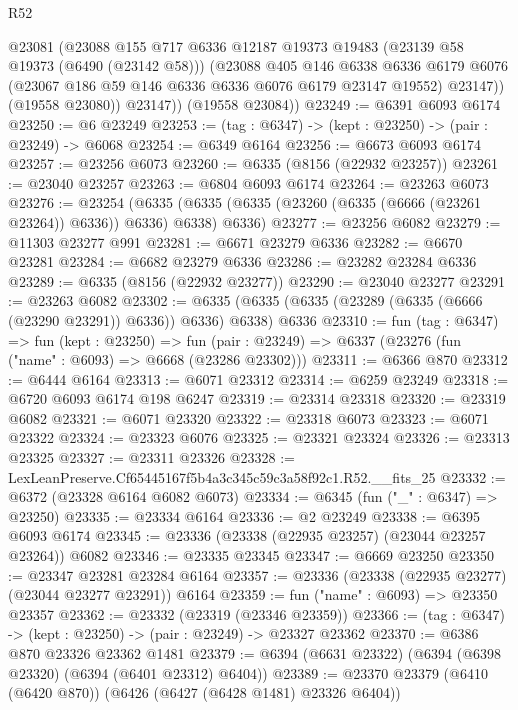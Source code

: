 \begin{lexlean}{R52}
\begin{coremodule}
            @23081
            (@23088
              @155
              @717
              @6336
              @12187
              @19373
              @19483
              (@23139 @58 @19373 (@6490 (@23142 @58)))
              (@23088
                @405
                @146
                @6338
                @6336
                @6179
                @6076
                (@23067 @186 @59 @146 @6336 @6336 @6076 @6179 @23147 @19552)
                @23147))
            (@19558 @23080))
          @23147))
      (@19558 @23084))
@23249 := @6391 @6093 @6174
@23250 := @6 @23249
@23253 := (tag : @6347) -> (kept : @23250) -> (pair : @23249) -> @6068
@23254 := @6349 @6164
@23256 := @6673 @6093 @6174
@23257 := @23256 @6073
@23260 := @6335 (@8156 (@22932 @23257))
@23261 := @23040 @23257
@23263 := @6804 @6093 @6174
@23264 := @23263 @6073
@23276 := @23254
    (@6335 (@6335 (@6335 (@23260 (@6335 (@6666 (@23261 @23264)) @6336)) @6336) @6338) @6336)
@23277 := @23256 @6082
@23279 := @11303 @23277 @991
@23281 := @6671 @23279 @6336
@23282 := @6670 @23281
@23284 := @6682 @23279 @6336
@23286 := @23282 @23284 @6336
@23289 := @6335 (@8156 (@22932 @23277))
@23290 := @23040 @23277
@23291 := @23263 @6082
@23302 := @6335 (@6335 (@6335 (@23289 (@6335 (@6666 (@23290 @23291)) @6336)) @6336) @6338) @6336
@23310 := fun (tag : @6347) =>
  fun (kept : @23250) =>
  fun (pair : @23249) => @6337 (@23276 (fun ("name" : @6093) => @6668 (@23286 @23302)))
@23311 := @6366 @870
@23312 := @6444 @6164
@23313 := @6071 @23312
@23314 := @6259 @23249
@23318 := @6720 @6093 @6174 @198 @6247
@23319 := @23314 @23318
@23320 := @23319 @6082
@23321 := @6071 @23320
@23322 := @23318 @6073
@23323 := @6071 @23322
@23324 := @23323 @6076
@23325 := @23321 @23324
@23326 := @23313 @23325
@23327 := @23311 @23326
@23328 := LexLeanPreserve.Cf65445167f5b4a3c345c59c3a58f92c1.R52.__fits_25
@23332 := @6372 (@23328 @6164 @6082 @6073)
@23334 := @6345 (fun ("_" : @6347) => @23250)
@23335 := @23334 @6164
@23336 := @2 @23249
@23338 := @6395 @6093 @6174
@23345 := @23336 (@23338 (@22935 @23257) (@23044 @23257 @23264)) @6082
@23346 := @23335 @23345
@23347 := @6669 @23250
@23350 := @23347 @23281 @23284 @6164
@23357 := @23336 (@23338 (@22935 @23277) (@23044 @23277 @23291)) @6164
@23359 := fun ("name" : @6093) => @23350 @23357
@23362 := @23332 (@23319 (@23346 @23359))
@23366 := (tag : @6347) -> (kept : @23250) -> (pair : @23249) -> @23327 @23362
@23370 := @6386 @870 @23326 @23362 @1481
@23379 := @6394 (@6631 @23322) (@6394 (@6398 @23320) (@6394 (@6401 @23312) @6404))
@23389 := @23370 @23379 (@6410 (@6420 @870)) (@6426 (@6427 (@6428 @1481) @23326 @6404))

\end{coremodule}
\end{lexlean}
